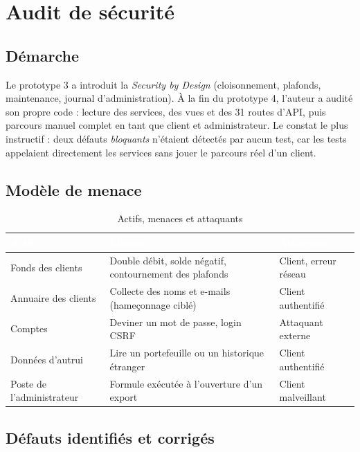 \documentclass[11pt,a4paper]{report}
\newcommand{\entete}{\rowcolor{primaire}}
\newcommand{\tete}[1]{\textcolor{white}{\textbf{#1}}}
\begin{document}
\chapter{Audit de sécurité}

\section{Démarche}

Le prototype 3 a introduit la \emph{Security by Design} (cloisonnement, plafonds,
maintenance, journal d'administration). À la fin du prototype 4, l'auteur a audité
son propre code : lecture des services, des vues et des 31 routes d'API, puis
parcours manuel complet en tant que client et administrateur. Le constat le plus
instructif : deux défauts \emph{bloquants} n'étaient détectés par aucun test, car
les tests appelaient directement les services sans jouer le parcours réel d'un client.

\section{Modèle de menace}

\begin{table}[H]
\centering
\caption{Actifs, menaces et attaquants}
\begin{tabularx}{\linewidth}{@{}p{3.4cm}Yp{3.4cm}@{}}
\toprule
\entete \tete{Actif} & \tete{Menace} & \tete{Attaquant} \\
\midrule
Fonds des clients & Double débit, solde négatif, contournement des plafonds & Client, erreur réseau \\
Annuaire des clients & Collecte des noms et e-mails (hameçonnage ciblé) & Client authentifié \\
Comptes & Deviner un mot de passe, login CSRF & Attaquant externe \\
Données d'autrui & Lire un portefeuille ou un historique étranger & Client authentifié \\
Poste de l'administrateur & Formule exécutée à l'ouverture d'un export & Client malveillant \\
\bottomrule
\end{tabularx}
\end{table}

\section{Défauts identifiés et corrigés}
\end{document}
